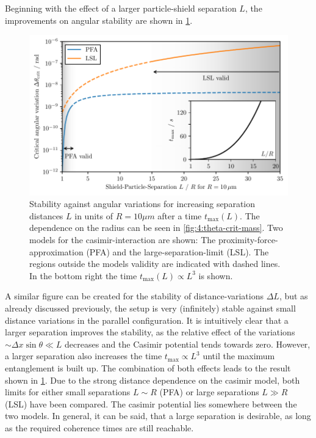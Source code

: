 Beginning with the effect of a larger particle-shield separation $L$, the improvements on angular stability are shown in \cref{fig:4:theta-crit-L}.
\begin{figure}[!htbp]
  \centering
  \includegraphics[width=\textwidth]{./../figures/theta-variance/theta-crit-L.pdf}
  \caption{Stability against angular variations for increasing separation distances $L$ in units of $R=10\si{\mu m}$ after a time $t_\mathrm{max}(L)$. The dependence on the radius can be seen in \cref{fig:4:theta-crit-mass}. Two models for the casimir-interaction are shown: The proximity-force-approximation (PFA) and the large-separation-limit (LSL). The regions outside the models validity are indicated with dashed lines. In the bottom right the time $t_\mathrm{max}(L) \propto L^3$ is shown.}
  \label{fig:4:theta-crit-L}
\end{figure}
A similar figure can be created for the stability of distance-variations $\Delta L$, but as already discussed previously, the setup is very (infinitely) stable against small distance variations in the parallel configuration.
It is intuitively clear that a larger separation improves the stability, as the relative effect of the variations $\sim \Delta x \sin\theta \ll L$ decreases and the Casimir potential tends towards zero.
However, a larger separation also increases the time $t_\mathrm{max} \propto L^3$ until the maximum entanglement is built up.
The combination of both effects leads to the result shown in \cref{fig:4:theta-crit-L}.
Due to the strong distance dependence on the casimir model, both limits for either small separations $L \sim R$ (PFA) or large separations $L \gg R$ (LSL) have been compared. 
The  casimir potential lies somewhere between the two models.
In general, it can be said, that a large separation is desirable, as long as the required coherence times are still reachable.

